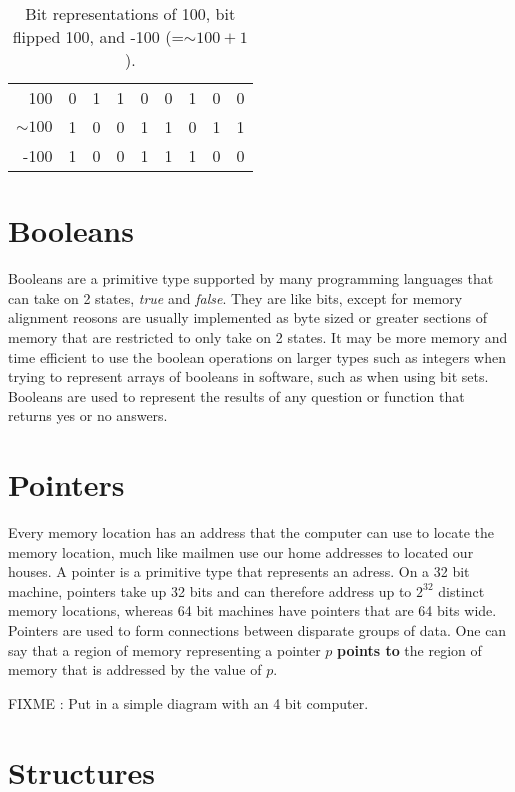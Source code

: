 \documentclass[12pt, letterpaper]{book}
\begin{document}
\begin{table}[h]
\centering
\begin{tabular}{r|l|l|l|l|l|l|l|l|}
\cline{2-9}
100 & 0 & 1 & 1 & 0 & 0 & 1 & 0 & 0 \\ \cline{2-9} 
$\sim 100$ & 1 & 0 & 0 & 1 & 1 & 0 & 1& 1 \\ \cline{2-9} 
-100 & 1 & 0 & 0 & 1 & 1 & 1 & 0 & 0 \\ \cline{2-9} 
\end{tabular}
\caption{Bit representations of 100, bit flipped 100, and -100 (=$\sim 100 + 1$).}
\label{figure:2scomplement}
\end{table}

	\section{Booleans}

	Booleans are a primitive type supported by many programming languages that can take on 2 states, \textit{true} and \textit{false}. They are like bits, except for memory alignment reosons are usually implemented as byte sized or greater sections of memory that are restricted to only take on 2 states. It may be more memory and time efficient to use the boolean operations on larger types such as integers when trying to represent arrays of booleans in software, such as when using bit sets. Booleans are used to represent the results of any question or function that returns yes or no answers.

	\section{Pointers}

	Every memory location has an address that the computer can use to locate the memory location, much like mailmen use our home addresses to located our houses. A pointer is a primitive type that represents an adress. On a 32 bit machine, pointers take up 32 bits and can therefore address up to $2^{32}$ distinct memory locations, whereas 64 bit machines have pointers that are 64 bits wide. Pointers are used to form connections between disparate groups of data. One can say that a region of memory representing a pointer $p$ \textbf{points to} the region of memory that is addressed by the value of $p$.

FIXME : Put in a simple diagram with an 4 bit computer.

	\section{Structures}
\end{document}
